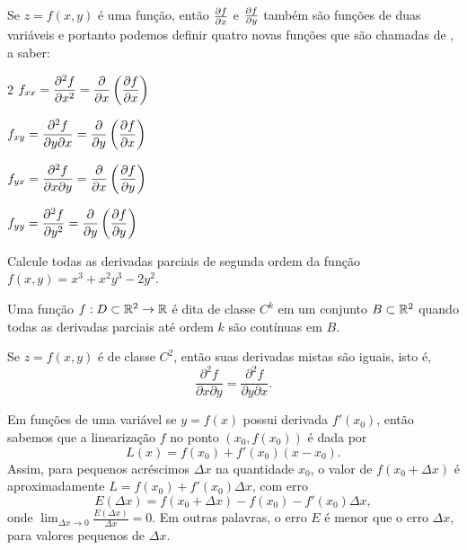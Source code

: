 
Se $z=f(x,y)$ é uma função, então  $\frac{\partial f}{\partial x}$ e $\frac{\partial f}{\partial y}$ também são funções de duas variáveis e portanto  podemos definir quatro novas funções que são chamadas de , a saber:
\begin{multicols}{2}
$\displaystyle f_{xx}=\frac{\partial^2f}{\partial x^2}=\frac{\partial }{\partial x}\left(\frac{\partial f}{\partial x}\right)$

$\displaystyle f_{xy}=\frac{\partial^2f}{\partial y\partial x}=\frac{\partial  }{\partial y}\left(\frac{\partial f}{\partial x}\right)$


$\displaystyle f_{yx}=\frac{\partial^2f}{\partial x\partial y}=\frac{\partial }{\partial x}\left(\frac{\partial f}{\partial y}\right)$

$\displaystyle f_{yy}=\frac{\partial^2f}{\partial y^2}=\frac{\partial }{\partial y}\left(\frac{\partial f}{\partial y}\right)$

\end{multicols}

\begin{exeb}{}{} Calcule todas as derivadas parciais de segunda ordem da função $f(x,y)=x^3+x^2y^3-2y^2$.
\end{exeb}


\newpage

\begin{definb}{}{}
	Uma função $f:D\subset \mathbb{R}^2\to \mathbb{R}$ é dita de {\color{blue}classe $C^k$} em um conjunto $B\subset\mathbb{R}^2$ quando todas as derivadas parciais até ordem \(k\) são contínuas em $B$.
\end{definb}


\begin{theoremb}{}{} Se $z=f(x,y)$ é de classe $C^2$, então suas derivadas mistas são iguais, isto é,
	$$\frac{\partial^2 f}{\partial x\partial y}=\frac{\partial^2 f}{\partial y\partial x}.$$
\end{theoremb}


Em funções de uma variável  se {\color{blue}$y=f(x)$ possui derivada  $f'(x_0)$}, então sabemos que a {\color{blue}linearização} $f$ no ponto $(x_0,f(x_0))$ é dada por
\[L(x)=f(x_0)+f'(x_0)(x-x_0).\]
Assim, para pequenos acréscimos $\Delta x$ na quantidade $x_0$, o valor de $f(x_0+\Delta x)$ é aproximadamente $L=f(x_0)+f'(x_0)\Delta x$, com erro
\[E(\Delta x)=f(x_0+\Delta x)-f(x_0)-f'(x_0)\Delta x,\]
onde {\color{red}$\displaystyle\lim_{\Delta x\to 0}\frac{E(\Delta x)}{\Delta x}=0.$} Em outras palavras, o erro $E$ é menor que o erro $\Delta x$, para valores pequenos de $\Delta x$.


